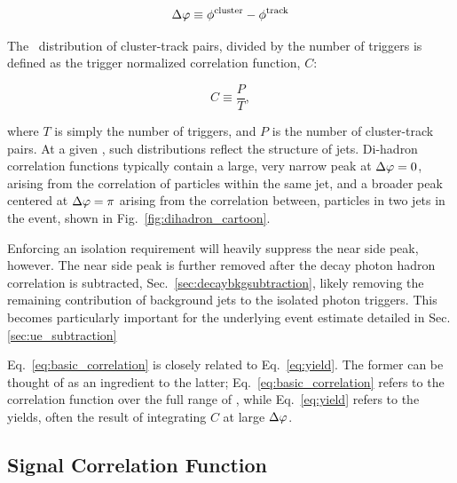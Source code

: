 \begin{equation}
	\Delta\varphi \equiv \phi^\mathrm{cluster} - \phi^\mathrm{track}
\end{equation}

The \deltaphi~distribution of cluster-track pairs, divided by the number of triggers is defined as the trigger normalized correlation function, $C$:

\begin{equation}
  \label{eq:basic_correlation}
  C \equiv \frac{P}{T},
\end{equation}

where $T$ is simply the number of triggers, and $P$ is the number of cluster-track pairs. At a given \deltaphi, such distributions reflect the structure of jets. Di-hadron correlation functions typically contain a large, very narrow peak at $\Delta\varphi=0$, arising from the correlation of particles within the same jet, and a broader peak centered at $\Delta\varphi=\pi$ arising from the correlation between, particles in two jets in the event, shown in Fig.~\ref{fig:dihadron_cartoon}. 

Enforcing an isolation requirement will heavily suppress the near side peak, however. The near side peak is further removed after the decay photon hadron correlation is subtracted, Sec.~\ref{sec:decaybkgsubtraction}, likely removing the remaining contribution of background jets to the isolated photon triggers. This becomes particularly important for the underlying event estimate detailed in Sec.\ref{sec:ue_subtraction}




Eq.~\ref{eq:basic_correlation} is closely related to Eq.~\ref{eq:yield}. The former can be thought of as an ingredient to the latter; Eq.~\ref{eq:basic_correlation} refers to the correlation function over the full range of \deltaphi, while Eq.~\ref{eq:yield} refers to the yields, often the result of integrating $C$ at large  $\Delta\varphi$.

\subsection{Signal Correlation Function}


